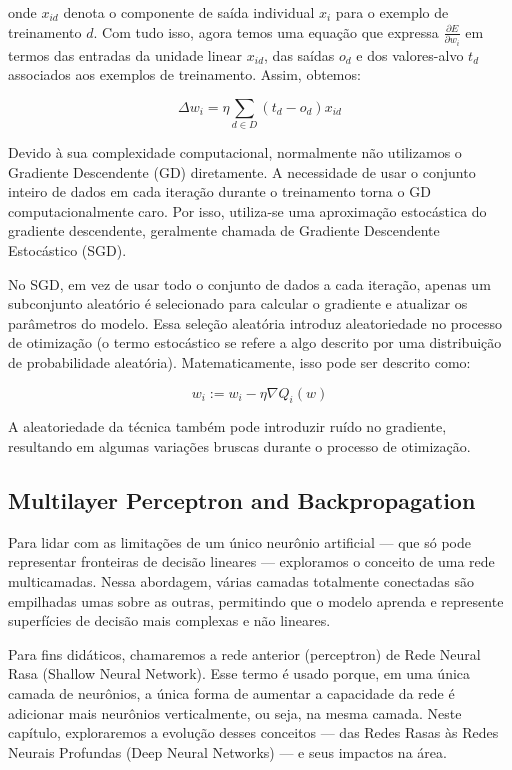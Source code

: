 \documentclass{article}
\begin{document}
onde $x_{id}$ denota o componente de saída individual $x_i$ para o exemplo de treinamento $d$.
Com tudo isso, agora temos uma equação que expressa $\frac{\partial E}{\partial w_i}$ em termos das entradas da unidade linear $x_{id}$, das saídas $o_d$ e dos valores-alvo $t_d$ associados aos exemplos de treinamento. Assim, obtemos:

\begin{equation}
\Delta w_i = \eta \sum_{d \in D} (t_d - o_d)x_{id}
\end{equation}

Devido à sua complexidade computacional, normalmente não utilizamos o Gradiente Descendente (GD) diretamente.
A necessidade de usar o conjunto inteiro de dados em cada iteração durante o treinamento torna o GD computacionalmente caro.
Por isso, utiliza-se uma aproximação estocástica do gradiente descendente, geralmente chamada de Gradiente Descendente Estocástico (SGD).

No SGD, em vez de usar todo o conjunto de dados a cada iteração, apenas um subconjunto aleatório é selecionado para calcular o gradiente e atualizar os parâmetros do modelo.
Essa seleção aleatória introduz aleatoriedade no processo de otimização (o termo estocástico se refere a algo descrito por uma distribuição de probabilidade aleatória).
Matematicamente, isso pode ser descrito como:

\begin{equation}
w_i := w_i - \eta \nabla Q_i (w)
\end{equation}

A aleatoriedade da técnica também pode introduzir ruído no gradiente, resultando em algumas variações bruscas durante o processo de otimização.

\subsection{Multilayer Perceptron and Backpropagation}
Para lidar com as limitações de um único neurônio artificial — que só pode representar fronteiras de decisão lineares — exploramos o conceito de uma rede multicamadas.
Nessa abordagem, várias camadas totalmente conectadas são empilhadas umas sobre as outras, permitindo que o modelo aprenda e represente superfícies de decisão mais complexas e não lineares.

Para fins didáticos, chamaremos a rede anterior (perceptron) de Rede Neural Rasa (Shallow Neural Network). Esse termo é usado porque, em uma única camada de neurônios, a única forma de aumentar a capacidade da rede é adicionar mais neurônios verticalmente, ou seja, na mesma camada.
Neste capítulo, exploraremos a evolução desses conceitos — das Redes Rasas às Redes Neurais Profundas (Deep Neural Networks) — e seus impactos na área.
\end{document}
